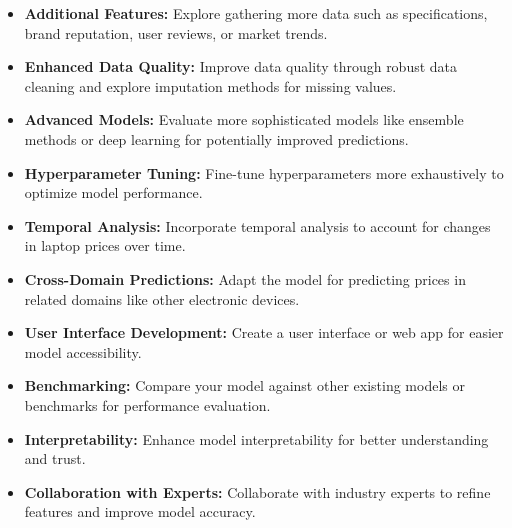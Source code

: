\documentclass[
11pt, %
english, %
singlespacing, %
headsepline, %
]{MastersDoctoralThesis} %
\begin{document}
\begin{itemize}
    \item \textbf{Additional Features:}
Explore gathering more data such as specifications, brand reputation, user reviews, or market trends.

\item \textbf{Enhanced Data Quality:}
Improve data quality through robust data cleaning and explore imputation methods for missing values.

\item \textbf{Advanced Models:}
Evaluate more sophisticated models like ensemble methods or deep learning for potentially improved predictions.

\item \textbf{Hyperparameter Tuning:}
Fine-tune hyperparameters more exhaustively to optimize model performance.

\item \textbf{Temporal Analysis:}
Incorporate temporal analysis to account for changes in laptop prices over time.

\item \textbf{Cross-Domain Predictions:}
Adapt the model for predicting prices in related domains like other electronic devices.

\item \textbf{User Interface Development:}
Create a user interface or web app for easier model accessibility.

\item \textbf{Benchmarking:}
Compare your model against other existing models or benchmarks for performance evaluation.

\item \textbf{Interpretability:}
Enhance model interpretability for better understanding and trust.

\item \textbf{Collaboration with Experts:}
Collaborate with industry experts to refine features and improve model accuracy.
\end{itemize}
\end{document}
